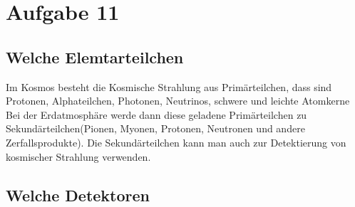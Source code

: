 \section{Aufgabe 11}
\subsection{Welche Elemtarteilchen}
Im Kosmos besteht die Kosmische Strahlung aus Primärteilchen, dass sind Protonen, Alphateilchen, Photonen, Neutrinos, schwere und leichte Atomkerne
Bei der Erdatmosphäre werde dann diese geladene Primärteilchen zu Sekundärteilchen(Pionen, Myonen, Protonen, Neutronen und andere Zerfallsprodukte). Die Sekundärteilchen kann man auch zur Detektierung von kosmischer Strahlung verwenden.
\subsection{Welche Detektoren}
